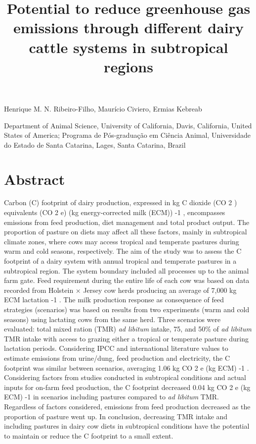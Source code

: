 \documentclass[11pt,a4paper]{article}
\title{Potential to reduce greenhouse gas emissions through different dairy cattle systems in subtropical regions}
\begin{document}
\maketitle

Henrique M. N. Ribeiro-Filho, Maurício Civiero, Ermias Kebreab

Department of Animal Science, University of California, Davis, California, United States of America; Programa de Pós-graduação em Ciência Animal, Universidade do Estado de Santa Catarina, Lages, Santa Catarina, Brazil

\section{Abstract}

Carbon (C) footprint of dairy production, expressed in kg C dioxide (CO 2 ) equivalents (CO 2 e) (kg energy-corrected milk (ECM)) -1 , encompasses emissions from feed production, diet management and total product output. The proportion of pasture on diets may affect all these factors, mainly in subtropical climate zones, where cows may access tropical and temperate pastures during warm and cold seasons, respectively. The aim of the study was to assess the C footprint of a dairy system with annual tropical and temperate pastures in a subtropical region. The system boundary included all processes up to the animal farm gate. Feed requirement during the entire life of each cow was based on data recorded from Holstein × Jersey cow herds producing an average of 7,000 kg ECM lactation -1 . The milk production response as consequence of feed strategies (scenarios) was based on results from two experiments (warm and cold seasons) using lactating cows from the same herd. Three scenarios were evaluated: total mixed ration (TMR) \textit{ad libitum} intake, 75, and 50\% of \textit{ad libitum} TMR intake with access to grazing either a tropical or temperate pasture during lactation periods. Considering IPCC and international literature values to estimate emissions from urine/dung, feed production and electricity, the C footprint was similar between scenarios, averaging 1.06 kg CO 2 e (kg ECM) -1 . Considering factors from studies conducted in subtropical conditions and actual inputs for on-farm feed production, the C footprint decreased 0.04 kg CO 2 e (kg ECM) -1 in scenarios including pastures compared to \textit{ad libitum} TMR. Regardless of factors considered, emissions from feed production decreased as the proportion of pasture went up. In conclusion, decreasing TMR intake and including pastures in dairy cow diets in subtropical conditions have the potential to maintain or reduce the C footprint to a small extent.
\end{document}
